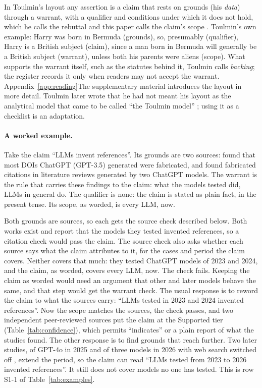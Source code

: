 \documentclass[12pt, a4paper]{article}
\newcommand{\supplementref}{\ifdefined\preprintmode Appendix~\ref{app:reading}\else The supplementary material\fi}
\begin{document}
In Toulmin's layout any assertion is a claim that rests on grounds
(his \emph{data}) through a warrant, with a qualifier and conditions
under which it does not hold, which he calls the rebuttal and this paper
calls the claim's scope \citep[pp.~90--94]{toulmin2003}.  Toulmin's own
example: Harry was born in Bermuda (grounds), so, presumably
(qualifier), Harry is a British subject (claim), since a man born in
Bermuda will generally be a British subject (warrant), unless both his
parents were aliens (scope).  What supports the warrant itself, such as
the statutes behind it, Toulmin calls \emph{backing}; the register
records it only when readers may not accept the warrant.
\supplementref{} introduces the layout in more detail.  Toulmin later
wrote that he had not meant his layout as the analytical model that came to be
called ``the Toulmin model'' \citep[p.~vii]{toulmin2003}; using it as a checklist is an adaptation.

\paragraph{A worked example.}
Take the claim ``LLMs invent references''.  Its
grounds are two sources: \citet{mugaanyi2024} found that most DOIs
ChatGPT (GPT-3.5) generated were fabricated, and \citet{walters2023}
found fabricated citations in literature reviews generated by two
ChatGPT models.  The warrant is the rule that carries these findings to
the claim: what the models tested did, LLMs in general do.  The
qualifier is none: the claim is stated as plain fact, in the present
tense.  Its scope, as worded, is every LLM, now.

Both grounds are sources, so each gets the source check described
below.  Both works exist and report that the models they tested invented
references, so a citation check would pass the claim.  The source check also asks whether each
source says what the claim attributes to it, for the cases and period
the claim covers.  Neither covers that much: they tested ChatGPT models of 2023 and
2024, and the claim, as worded, covers every LLM, now.  The check fails.
Keeping the claim as worded would need an argument that other and later
models behave the same, and that step would get the warrant check.  The
usual response is to reword the claim to what the sources carry: ``LLMs tested in 2023 and 2024 invented
references''.  Now the scope matches the sources, the check passes, and
two independent peer-reviewed sources put the claim at the Supported
tier (Table~\ref{tab:confidence}), which permits ``indicates'' or a
plain report of what the studies found.  The other response is to find
grounds that reach further.  Two later studies, of GPT-4o in 2025
\citep{linardon2025} and of three models in 2026 with web search switched off
\citep{seifi2026},
extend the period, so the claim can read ``LLMs tested from 2023 to
2026 invented references''.  It still does not cover models no one has
tested.  This is row S1-1 of Table~\ref{tab:examples}.
\end{document}
